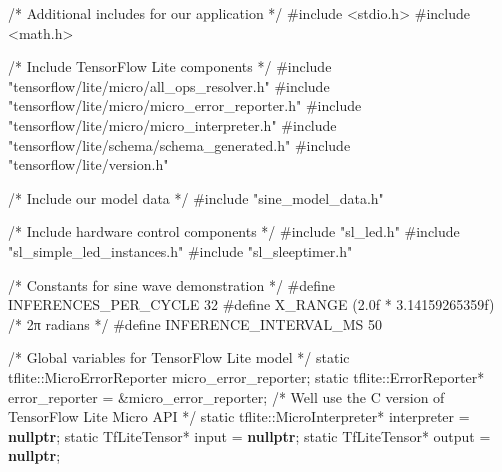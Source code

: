 \documentclass[
  9pt,
  letterpaper,
  abstract,
  titlepage]{scrbook}
\newenvironment{Shaded}{\begin{snugshade}}{\end{snugshade}}
\newcommand{\BuiltInTok}[1]{\textcolor[rgb]{0.00,0.23,0.31}{#1}}
\newcommand{\CommentTok}[1]{\textcolor[rgb]{0.37,0.37,0.37}{#1}}
\newcommand{\DataTypeTok}[1]{\textcolor[rgb]{0.68,0.00,0.00}{#1}}
\newcommand{\DecValTok}[1]{\textcolor[rgb]{0.68,0.00,0.00}{#1}}
\newcommand{\FloatTok}[1]{\textcolor[rgb]{0.68,0.00,0.00}{#1}}
\newcommand{\ImportTok}[1]{\textcolor[rgb]{0.00,0.46,0.62}{#1}}
\newcommand{\KeywordTok}[1]{\textcolor[rgb]{0.00,0.23,0.31}{\textbf{#1}}}
\newcommand{\NormalTok}[1]{\textcolor[rgb]{0.00,0.23,0.31}{#1}}
\newcommand{\OperatorTok}[1]{\textcolor[rgb]{0.37,0.37,0.37}{#1}}
\newcommand{\PreprocessorTok}[1]{\textcolor[rgb]{0.68,0.00,0.00}{#1}}
\begin{document}
\begin{Shaded}
\begin{Highlighting}[]
\CommentTok{/* Additional includes for our application */}
\PreprocessorTok{\#include }\ImportTok{\textless{}stdio.h\textgreater{}}
\PreprocessorTok{\#include }\ImportTok{\textless{}math.h\textgreater{}}

\CommentTok{/* Include TensorFlow Lite components */}
\PreprocessorTok{\#include }\ImportTok{"tensorflow/lite/micro/all\_ops\_resolver.h"}
\PreprocessorTok{\#include }\ImportTok{"tensorflow/lite/micro/micro\_error\_reporter.h"}
\PreprocessorTok{\#include }\ImportTok{"tensorflow/lite/micro/micro\_interpreter.h"}
\PreprocessorTok{\#include }\ImportTok{"tensorflow/lite/schema/schema\_generated.h"}
\PreprocessorTok{\#include }\ImportTok{"tensorflow/lite/version.h"}

\CommentTok{/* Include our model data */}
\PreprocessorTok{\#include }\ImportTok{"sine\_model\_data.h"}

\CommentTok{/* Include hardware control components */}
\PreprocessorTok{\#include }\ImportTok{"sl\_led.h"}
\PreprocessorTok{\#include }\ImportTok{"sl\_simple\_led\_instances.h"}
\PreprocessorTok{\#include }\ImportTok{"sl\_sleeptimer.h"}

\CommentTok{/* Constants for sine wave demonstration */}
\PreprocessorTok{\#define INFERENCES\_PER\_CYCLE  }\DecValTok{32}
\PreprocessorTok{\#define X\_RANGE               }\OperatorTok{(}\FloatTok{2.0}\BuiltInTok{f}\PreprocessorTok{ }\OperatorTok{*}\PreprocessorTok{ }\FloatTok{3.14159265359}\BuiltInTok{f}\OperatorTok{)}\PreprocessorTok{  }\CommentTok{/* 2π radians */}
\PreprocessorTok{\#define INFERENCE\_INTERVAL\_MS }\DecValTok{50}

\CommentTok{/* Global variables for TensorFlow Lite model */}
\DataTypeTok{static}\NormalTok{ tflite}\OperatorTok{::}\NormalTok{MicroErrorReporter micro\_error\_reporter}\OperatorTok{;}
\DataTypeTok{static}\NormalTok{ tflite}\OperatorTok{::}\NormalTok{ErrorReporter}\OperatorTok{*}\NormalTok{ error\_reporter }\OperatorTok{=} \OperatorTok{\&}\NormalTok{micro\_error\_reporter}\OperatorTok{;}
\CommentTok{/* We\textquotesingle{}ll use the C version of TensorFlow Lite Micro API */}
\DataTypeTok{static}\NormalTok{ tflite}\OperatorTok{::}\NormalTok{MicroInterpreter}\OperatorTok{*}\NormalTok{ interpreter }\OperatorTok{=} \KeywordTok{nullptr}\OperatorTok{;}
\DataTypeTok{static}\NormalTok{ TfLiteTensor}\OperatorTok{*}\NormalTok{ input }\OperatorTok{=} \KeywordTok{nullptr}\OperatorTok{;}
\DataTypeTok{static}\NormalTok{ TfLiteTensor}\OperatorTok{*}\NormalTok{ output }\OperatorTok{=} \KeywordTok{nullptr}\OperatorTok{;}


\end{Highlighting}
\end{Shaded}
\end{document}
